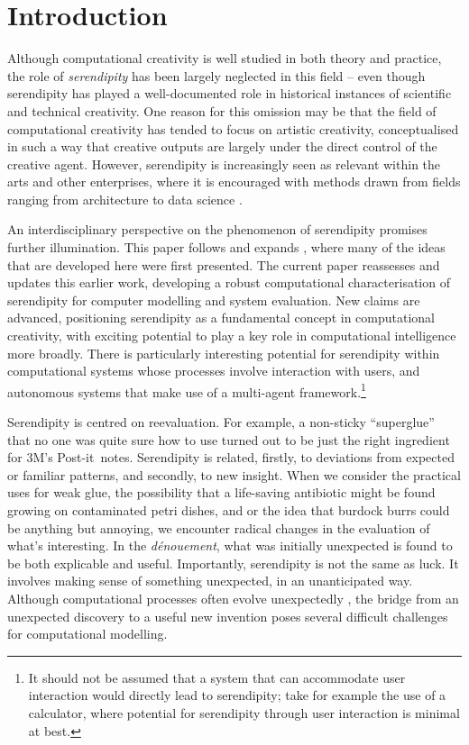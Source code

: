 \section{Introduction}

Although computational creativity is well studied in both theory and
practice, the role of \emph{serendipity} has been largely neglected
in this field -- even though serendipity has played a well-documented
role in historical instances of scientific and technical creativity.
One reason for this omission may be that the field of computational
creativity has tended to focus on artistic creativity, conceptualised in such a way that creative outputs are largely under the direct control of the creative agent.  However,  serendipity is increasingly seen as relevant within the arts
\cite{mckay-serendipity} and other enterprises, where it is encouraged with methods drawn from fields ranging from architecture to data science \cite{kakko2009homo,engineering-serendipity}. 


An interdisciplinary perspective on the phenomenon of serendipity
promises further illumination.   
  This paper follows and expands , where many of the ideas that are developed here were first presented.  The current paper reassesses and updates this earlier work, developing a robust computational characterisation of serendipity for computer modelling and system evaluation. New claims are advanced, positioning serendipity as a fundamental concept in computational creativity, with exciting potential to play a key role in computational intelligence more broadly.  There is particularly interesting potential for serendipity within computational systems whose processes involve interaction with users, and autonomous systems that make use of a multi-agent framework.\footnote{It should not be assumed that a system that can accommodate user interaction would directly lead to serendipity; take for example the use of a calculator, where potential for serendipity through user interaction is minimal at best.}

Serendipity is centred on reevaluation.  For example, a
non-sticky ``superglue'' that no one was quite sure how to use turned
out to be just the right ingredient for 3M's
Post-it\texttrademark\ notes.
%
Serendipity is related, firstly, to deviations from expected or
familiar patterns, and secondly, to new insight.
%
When we consider the practical uses for weak glue, the possibility
that a life-saving antibiotic might be found growing on contaminated
petri dishes, and or the idea that burdock burrs could be anything but
annoying, we encounter radical changes in the evaluation of what's
interesting.  In the \emph{d\'enouement}, what was initially
unexpected is found to be both explicable and useful.  Importantly,
serendipity is not the same as luck.  It involves making sense of
something unexpected, in an unanticipated way.  Although computational
processes often evolve unexpectedly
\cite{minsky1967programming}, the bridge from an unexpected discovery
to a useful new invention poses several difficult challenges for
computational modelling.

